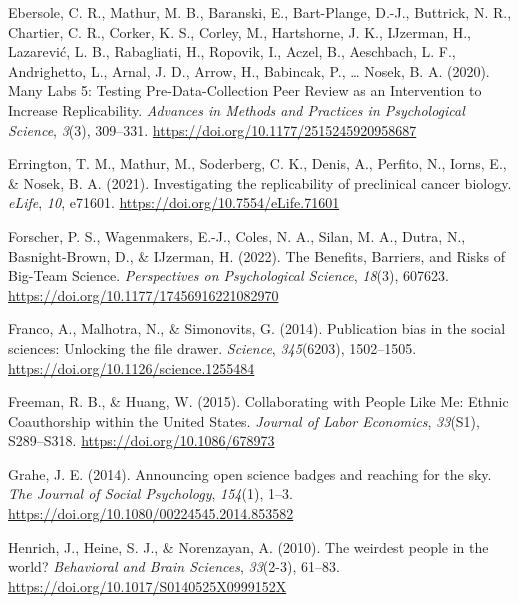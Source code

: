 \documentclass[
  man,mask,floatsintext]{apa7}
\newlength{\cslhangindent}
\newlength{\cslentryspacingunit} %
\newenvironment{CSLReferences}[2] %
 {%
  \setlength{\parindent}{0pt}
  \ifodd #1
  \let\oldpar\par
  \def\par{\hangindent=\cslhangindent\oldpar}
  \fi
  \setlength{\parskip}{#2\cslentryspacingunit}
 }%
 {}
\begin{document}
\begin{CSLReferences}{1}{0}
\leavevmode{}%
Ebersole, C. R., Mathur, M. B., Baranski, E., Bart-Plange, D.-J., Buttrick, N. R., Chartier, C. R., Corker, K. S., Corley, M., Hartshorne, J. K., IJzerman, H., Lazarević, L. B., Rabagliati, H., Ropovik, I., Aczel, B., Aeschbach, L. F., Andrighetto, L., Arnal, J. D., Arrow, H., Babincak, P., \ldots{} Nosek, B. A. (2020). Many Labs 5: Testing Pre-Data-Collection Peer Review as an Intervention to Increase Replicability. \emph{Advances in Methods and Practices in Psychological Science}, \emph{3}(3), 309--331. \url{https://doi.org/10.1177/2515245920958687}

\leavevmode{}%
Errington, T. M., Mathur, M., Soderberg, C. K., Denis, A., Perfito, N., Iorns, E., \& Nosek, B. A. (2021). Investigating the replicability of preclinical cancer biology. \emph{eLife}, \emph{10}, e71601. \url{https://doi.org/10.7554/eLife.71601}

\leavevmode{}%
Forscher, P. S., Wagenmakers, E.-J., Coles, N. A., Silan, M. A., Dutra, N., Basnight-Brown, D., \& IJzerman, H. (2022). The Benefits, Barriers, and Risks of Big-Team Science. \emph{Perspectives on Psychological Science}, \emph{18}(3), 607623. \url{https://doi.org/10.1177/17456916221082970}

\leavevmode{}%
Franco, A., Malhotra, N., \& Simonovits, G. (2014). Publication bias in the social sciences: Unlocking the file drawer. \emph{Science}, \emph{345}(6203), 1502--1505. \url{https://doi.org/10.1126/science.1255484}

\leavevmode{}%
Freeman, R. B., \& Huang, W. (2015). Collaborating with People Like Me: Ethnic Coauthorship within the United States. \emph{Journal of Labor Economics}, \emph{33}(S1), S289--S318. \url{https://doi.org/10.1086/678973}

\leavevmode{}%
Grahe, J. E. (2014). Announcing open science badges and reaching for the sky. \emph{The Journal of Social Psychology}, \emph{154}(1), 1--3. \url{https://doi.org/10.1080/00224545.2014.853582}

\leavevmode{}%
Henrich, J., Heine, S. J., \& Norenzayan, A. (2010). The weirdest people in the world? \emph{Behavioral and Brain Sciences}, \emph{33}(2-3), 61--83. \url{https://doi.org/10.1017/S0140525X0999152X}


\end{CSLReferences}
\end{document}
